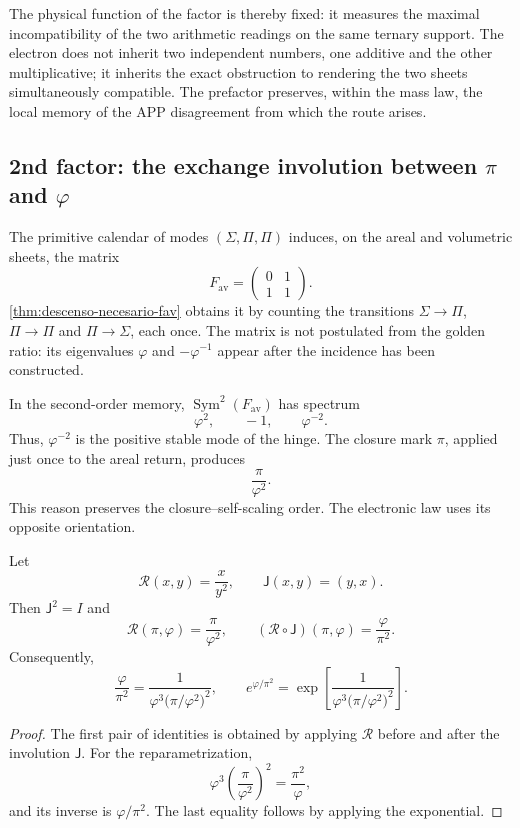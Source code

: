 The physical function of the factor is thereby fixed: it measures the maximal incompatibility of the two arithmetic readings on the same ternary support. The electron does not inherit two independent numbers, one additive and the other multiplicative; it inherits the exact obstruction to rendering the two sheets simultaneously compatible. The prefactor preserves, within the mass law, the local memory of the APP disagreement from which the route arises.

\subsection{2nd factor: the exchange involution between \(\pi\) and \(\varphi\)}

The primitive calendar of modes
\((\Sigma,\Pi,\Pi)\) induces, on the areal and volumetric sheets, the matrix
\[
 F_{\mathrm{av}}
 =
 \begin{pmatrix}
 0&1\\
 1&1
 \end{pmatrix}.
\]
\cref{thm:descenso-necesario-fav} obtains it by counting the transitions
\(\Sigma\to\Pi\), \(\Pi\to\Pi\) and \(\Pi\to\Sigma\), each once.
The matrix is not postulated from the golden ratio: its eigenvalues
\(\varphi\) and \(-\varphi^{-1}\) appear after the incidence has been
constructed.

In the second-order memory,
\(\operatorname{Sym}^2(F_{\mathrm{av}})\) has spectrum
\[
 \varphi^2,\qquad -1,\qquad\varphi^{-2}.
\]
Thus, \(\varphi^{-2}\) is the positive stable mode of the hinge. The closure
mark \(\pi\), applied just once to the areal return, produces
\[
 \frac{\pi}{\varphi^2}.
\]
This reason preserves the closure--self-scaling order. The electronic law uses its opposite orientation.

\begin{theorem}
\label{thm:espejo-electron-rev6}
Let
\[
 \mathscr R(x,y)=\frac{x}{y^2},
 \qquad
 \mathsf J(x,y)=(y,x).
\]
Then \(\mathsf J^2=I\) and
\[
 \mathscr R(\pi,\varphi)=\frac{\pi}{\varphi^2},
 \qquad
 (\mathscr R\circ\mathsf J)(\pi,\varphi)
 =\frac{\varphi}{\pi^2}.
\]
Consequently,
\[
 \frac{\varphi}{\pi^2}
 =
 \frac{1}{
 \varphi^3\bigl(\pi/\varphi^2\bigr)^2},
 \qquad
 e^{\varphi/\pi^2}
 =
 \exp\!\left[
 \frac{1}{
 \varphi^3\bigl(\pi/\varphi^2\bigr)^2}
 \right].
\]
\end{theorem}

\begin{proof}
The first pair of identities is obtained by applying \(\mathscr R\) before
and after the involution \(\mathsf J\). For the reparametrization,
\[
 \varphi^3
 \left(\frac{\pi}{\varphi^2}\right)^2
 =\frac{\pi^2}{\varphi},
\]
and its inverse is \(\varphi/\pi^2\). The last equality follows by applying
the exponential.
\end{proof}

